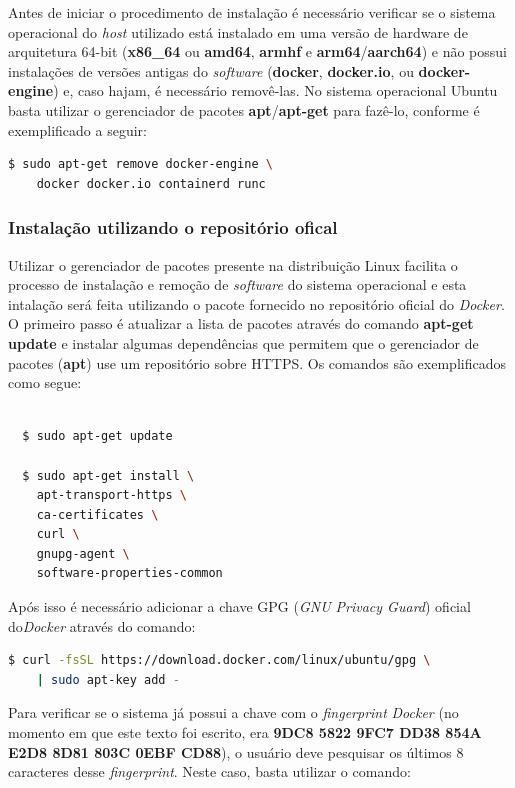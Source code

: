 \documentclass[
  12pt,				%
  openright,			%
  twoside,			%
  a4paper,			%
  english,			%
  french,				%
  spanish,			%
  brazil,				%
  ]{abntex2}
\begin{document}
Antes de iniciar o procedimento de instalação é necessário verificar se o sistema operacional do \textit{host} utilizado está instalado em uma versão de hardware
de arquitetura 64-bit (\textbf{x86\_64} ou \textbf{amd64}, \textbf{armhf} e \textbf{arm64}/\textbf{aarch64}) e não possui instalações de versões antigas
do \textit{software} (\textbf{docker}, \textbf{docker.io}, ou \textbf{docker-engine}) e, caso hajam, é necessário removê-las. No sistema
operacional Ubuntu basta utilizar o gerenciador de pacotes \textbf{apt}/\textbf{apt-get} para fazê-lo, conforme é exemplificado a seguir:

\begin{lstlisting}[language=bash]
  $ sudo apt-get remove docker-engine \
    docker docker.io containerd runc
  \end{lstlisting}

\subsubsection*{Instalação utilizando o repositório ofical}

Utilizar o gerenciador de pacotes presente na distribuição Linux facilita o processo de instalação e remoção de \textit{software} do sistema operacional e esta intalação será feita
utilizando o pacote fornecido no repositório oficial do \textit{Docker}. O primeiro
passo é atualizar a lista de pacotes através do comando \textbf{apt-get update} e instalar algumas dependências que permitem que o gerenciador de pacotes (\textbf{apt}) use um repositório sobre HTTPS.
Os comandos são exemplificados como segue:

\newpage
\begin{lstlisting}[language=bash]

  $ sudo apt-get update

  $ sudo apt-get install \
    apt-transport-https \
    ca-certificates \
    curl \
    gnupg-agent \
    software-properties-common
  \end{lstlisting}


Após isso é necessário adicionar a chave GPG (\textit{GNU Privacy Guard}) oficial do\textit{Docker} através do comando:

\begin{lstlisting}[language=bash]
  $ curl -fsSL https://download.docker.com/linux/ubuntu/gpg \
    | sudo apt-key add -
  \end{lstlisting}

Para verificar se o sistema já possui a chave com o \textit{fingerprint} \textit{Docker} (no momento em que este texto foi escrito,
era \textbf{9DC8 5822 9FC7 DD38 854A E2D8 8D81 803C 0EBF CD88}), o usuário deve pesquisar os últimos 8 caracteres desse \textit{fingerprint}. Neste caso, basta utilizar o comando:
\end{document}
